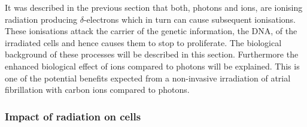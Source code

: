 \documentclass[type=dr, dr=rernat, accentcolor=tud7b,colorbacktitle, bigchapter, openright, twoside, 12pt ]{tudthesis}
\begin{document}
It was described in the previous section that both, photons and ions, are ionising radiation producing $\delta$-electrons which 
in turn can cause subsequent ionisations. These ionisations attack the carrier of the genetic information, the DNA, of the irradiated 
cells and hence causes them to stop to proliferate. The biological background of these processes will be described in this section. 
Furthermore the enhanced biological effect of ions compared to photons will be explained. This is one of the potential benefits expected 
from a non-invasive irradiation of atrial fibrillation with carbon ions compared to photons. 


\subsubsection{Impact of radiation on cells}
\end{document}
